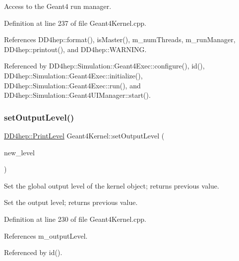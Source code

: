 Access to the Geant4 run manager. 



Definition at line 237 of file Geant4\+Kernel.\+cpp.



References D\+D4hep\+::format(), is\+Master(), m\+\_\+num\+Threads, m\+\_\+run\+Manager, D\+D4hep\+::printout(), and D\+D4hep\+::\+W\+A\+R\+N\+I\+NG.



Referenced by D\+D4hep\+::\+Simulation\+::\+Geant4\+Exec\+::configure(), id(), D\+D4hep\+::\+Simulation\+::\+Geant4\+Exec\+::initialize(), D\+D4hep\+::\+Simulation\+::\+Geant4\+Exec\+::run(), and D\+D4hep\+::\+Simulation\+::\+Geant4\+U\+I\+Manager\+::start().

\hypertarget{class_d_d4hep_1_1_simulation_1_1_geant4_kernel_abf3fb3881f4e504ab8c4b14aa17ac7c8}{}\label{class_d_d4hep_1_1_simulation_1_1_geant4_kernel_abf3fb3881f4e504ab8c4b14aa17ac7c8} 
\subsubsection{\texorpdfstring{set\+Output\+Level()}{setOutputLevel()}\hspace{0.1cm}{\footnotesize\ttfamily [1/2]}}
{\footnotesize\ttfamily \hyperlink{namespace_d_d4hep_a5b5a64d56252469451f2020a27d57d42}{D\+D4hep\+::\+Print\+Level} Geant4\+Kernel\+::set\+Output\+Level (\begin{DoxyParamCaption}\item[{\hyperlink{namespace_d_d4hep_a5b5a64d56252469451f2020a27d57d42}{Print\+Level}}]{new\+\_\+level }\end{DoxyParamCaption})}



Set the global output level of the kernel object; returns previous value. 

Set the output level; returns previous value. 

Definition at line 230 of file Geant4\+Kernel.\+cpp.



References m\+\_\+output\+Level.



Referenced by id().

\hypertarget{class_d_d4hep_1_1_simulation_1_1_geant4_kernel_aa2a86e9223fa508132a57669fab477d5}{}\label{class_d_d4hep_1_1_simulation_1_1_geant4_kernel_aa2a86e9223fa508132a57669fab477d5} 
